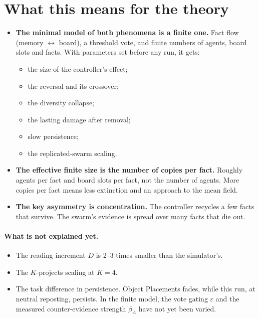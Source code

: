 \documentclass[10pt,a4paper]{article}
\begin{document}
\section{What this means for the theory}
\begin{itemize}
\item \textbf{The minimal model of both phenomena is a finite one.} Fact flow (memory $\leftrightarrow$ board), a
  threshold vote, and finite numbers of agents, board slots and facts. With parameters set before any run, it gets:
  \begin{itemize}
  \item the size of the controller's effect;
  \item the reversal and its crossover;
  \item the diversity collapse;
  \item the lasting damage after removal;
  \item slow persistence;
  \item the replicated-swarm scaling.
  \end{itemize}
\item \textbf{The effective finite size is the number of copies per fact.} Roughly agents per fact and board slots per
  fact, not the number of agents. More copies per fact means less extinction and an approach to the mean field.
\item \textbf{The key asymmetry is concentration.} The controller recycles a few facts that survive. The swarm's evidence
  is spread over many facts that die out.
\end{itemize}

\paragraph{What is not explained yet.}
\begin{itemize}
\item The reading increment $D$ is 2--3 times smaller than the simulator's.
\item The $K$-projects scaling at $K=4$.
\item The task difference in persistence. Object Placements fades, while this run, at neutral reposting, persists. In
  the finite model, the vote gating $\varepsilon$ and the measured counter-evidence strength $\beta_A$ have not yet been
  varied.
\end{itemize}
\end{document}
